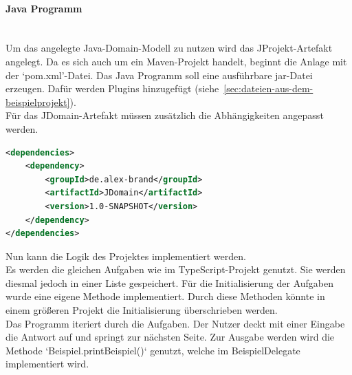 \documentclass[./einleitung.tex]{subfiles}
\begin{document}
    \paragraph{Java Programm}\mbox{}\\
    Um das angelegte Java-Domain-Modell zu nutzen wird das JProjekt-Artefakt angelegt.
    Da es sich auch um ein Maven-Projekt handelt, beginnt die Anlage mit der `pom.xml'-Datei.
    Das Java Programm soll eine ausführbare \acrshort{jar}-Datei erzeugen.
    Dafür werden Plugins hinzugefügt (siehe~\ref{sec:dateien-aus-dem-beispielprojekt}).\\
    Für das JDomain-Artefakt müssen zusätzlich die Abhängigkeiten angepasst werden.
    \begin{lstlisting}[language=XML, caption=Abhängigkeit zum JDomain Artefakt, label=lst:dependeciesJProjekt]
<dependencies>
    <dependency>
        <groupId>de.alex-brand</groupId>
        <artifactId>JDomain</artifactId>
        <version>1.0-SNAPSHOT</version>
    </dependency>
</dependencies>
    \end{lstlisting}
    Nun kann die Logik des Projektes implementiert werden.\\
    Es werden die gleichen Aufgaben wie im TypeScript-Projekt genutzt.
    Sie werden diesmal jedoch in einer Liste gespeichert.
    Für die Initialisierung der Aufgaben wurde eine eigene Methode implementiert.
    Durch diese Methoden könnte in einem größeren Projekt die Initialisierung überschrieben werden.\\
    Das Programm iteriert durch die Aufgaben.
    Der Nutzer deckt mit einer Eingabe die Antwort auf und springt zur nächsten Seite.
    Zur Ausgabe werden wird die Methode `Beispiel.printBeispiel()` genutzt, welche im BeispielDelegate implementiert wird.
\end{document}
